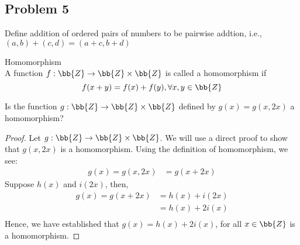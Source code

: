 \newpage
\subsection{Problem 5}
    \begin{tcolorbox}
        Define addition of ordered pairs of numbers to be pairwise addtion, i.e., $(a,b) + (c,d) = (a+c, b+d)$
            \begin{definition}
            Homomorphism \\
            A function $f: \bb{Z} \to \bb{Z} \times \bb{Z}$ is called a homomorphism if 
                \begin{equation*}
                    f(x + y) = f(x) + f(y), \forall x, y \in \bb{Z}
                \end{equation*}
            \end{definition}
        Is the function $g: \bb{Z} \to \bb{Z} \times \bb{Z}$ defined by $g(x) = g(x, 2x)$ a homomorphism? 
    \end{tcolorbox}
    
    \begin{proof}
        Let $g: \bb{Z} \to \bb{Z} \times \bb{Z}$. We will use a direct proof to show that $g(x, 2x)$ is a homomorphism. Using the definition of homomorphism, we see:
            \begin{align*}
                g(x) = g(x, 2x) & = g(x + 2x)
            \end{align*}
        Suppose $h(x)$ and $i(2x)$, then, 
            \begin{align*}
                g(x) = g(x + 2x) & = h(x) + i(2x) \\
                    & =  h(x) + 2i(x) \\
            \end{align*}
        Hence, we have established that $g(x) = h(x) + 2i(x)$, for all $x \in \bb{Z}$ is a homomorphism. 
    \end{proof}


